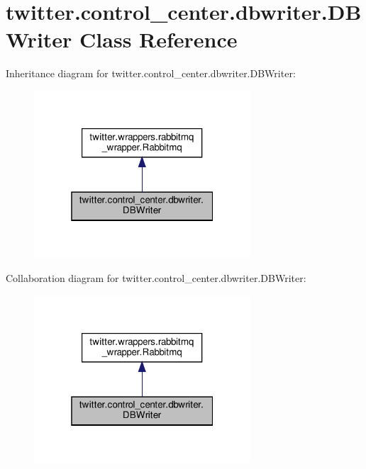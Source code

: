 \hypertarget{classtwitter_1_1control__center_1_1dbwriter_1_1DBWriter}{}\section{twitter.\+control\+\_\+center.\+dbwriter.\+D\+B\+Writer Class Reference}
\label{classtwitter_1_1control__center_1_1dbwriter_1_1DBWriter}


Inheritance diagram for twitter.\+control\+\_\+center.\+dbwriter.\+D\+B\+Writer\+:\nopagebreak
\begin{figure}[H]
\begin{center}
\leavevmode
\includegraphics[width=229pt]{classtwitter_1_1control__center_1_1dbwriter_1_1DBWriter__inherit__graph}
\end{center}
\end{figure}


Collaboration diagram for twitter.\+control\+\_\+center.\+dbwriter.\+D\+B\+Writer\+:\nopagebreak
\begin{figure}[H]
\begin{center}
\leavevmode
\includegraphics[width=229pt]{classtwitter_1_1control__center_1_1dbwriter_1_1DBWriter__coll__graph}
\end{center}
\end{figure}
